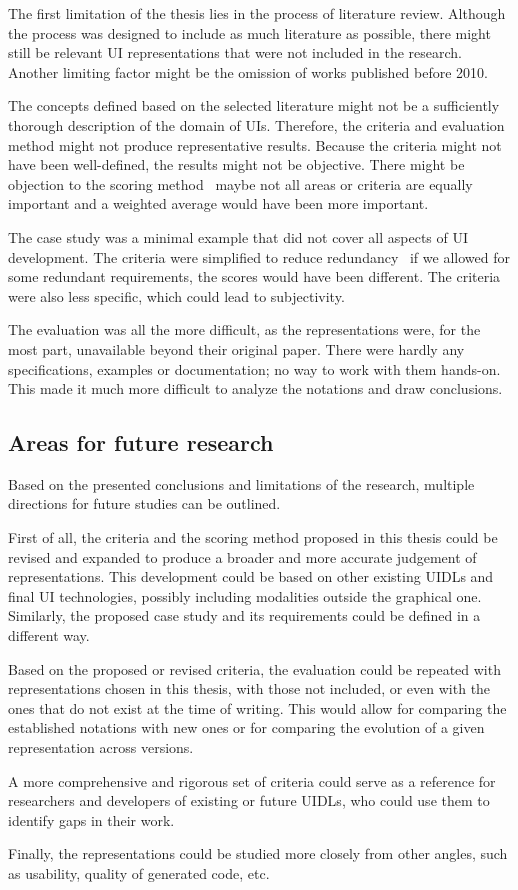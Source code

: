 The first limitation of the thesis lies in the process of literature review.
Although the process was designed to include as much literature as possible, there might still be relevant UI representations that were not included in the research.
Another limiting factor might be the omission of works published before 2010.

The concepts defined based on the selected literature might not be a sufficiently thorough description of the domain of UIs.
Therefore, the criteria and evaluation method might not produce representative results.
Because the criteria might not have been well-defined, the results might not be objective.
There might be objection to the scoring method \textendash\ maybe not all areas or criteria are equally important and a weighted average would have been more important.

The case study was a minimal example that did not cover all aspects of UI development.
The criteria were simplified to reduce redundancy \textendash\ if we allowed for some redundant requirements, the scores would have been different.
The criteria were also less specific, which could lead to subjectivity.

The evaluation was all the more difficult, as the representations were, for the most part, unavailable beyond their original paper.
There were hardly any specifications, examples or documentation; no way to work with them hands-on.
This made it much more difficult to analyze the notations and draw conclusions.

\subsection{Areas for future research}\label{subsec:areas-for-future-research}

Based on the presented conclusions and limitations of the research, multiple directions for future studies can be outlined.

First of all, the criteria and the scoring method proposed in this thesis could be revised and expanded to produce a broader and more accurate judgement of representations.
This development could be based on other existing UIDLs and final UI technologies, possibly including modalities outside the graphical one.
Similarly, the proposed case study and its requirements could be defined in a different way.

Based on the proposed or revised criteria, the evaluation could be repeated with representations chosen in this thesis, with those not included, or even with the ones that do not exist at the time of writing.
This would allow for comparing the established notations with new ones or for comparing the evolution of a given representation across versions.

A more comprehensive and rigorous set of criteria could serve as a reference for researchers and developers of existing or future UIDLs, who could use them to identify gaps in their work.

Finally, the representations could be studied more closely from other angles, such as usability, quality of generated code, etc.
